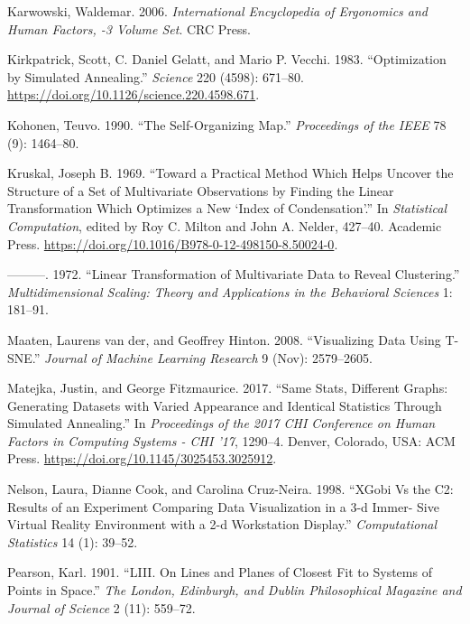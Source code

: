 \documentclass[11,]{article}
\begin{document}
\leavevmode\hypertarget{ref-karwowski_international_2006}{}%
Karwowski, Waldemar. 2006. \emph{International Encyclopedia of Ergonomics and Human Factors, -3 Volume Set}. CRC Press.

\leavevmode\hypertarget{ref-kirkpatrick_optimization_1983}{}%
Kirkpatrick, Scott, C. Daniel Gelatt, and Mario P. Vecchi. 1983. ``Optimization by Simulated Annealing.'' \emph{Science} 220 (4598): 671--80. \url{https://doi.org/10.1126/science.220.4598.671}.

\leavevmode\hypertarget{ref-kohonen_self-organizing_1990}{}%
Kohonen, Teuvo. 1990. ``The Self-Organizing Map.'' \emph{Proceedings of the IEEE} 78 (9): 1464--80.

\leavevmode\hypertarget{ref-kruskal_toward_1969}{}%
Kruskal, Joseph B. 1969. ``Toward a Practical Method Which Helps Uncover the Structure of a Set of Multivariate Observations by Finding the Linear Transformation Which Optimizes a New `Index of Condensation'.'' In \emph{Statistical Computation}, edited by Roy C. Milton and John A. Nelder, 427--40. Academic Press. \url{https://doi.org/10.1016/B978-0-12-498150-8.50024-0}.

\leavevmode\hypertarget{ref-kruskal_linear_1972}{}%
---------. 1972. ``Linear Transformation of Multivariate Data to Reveal Clustering.'' \emph{Multidimensional Scaling: Theory and Applications in the Behavioral Sciences} 1: 181--91.

\leavevmode\hypertarget{ref-maaten_visualizing_2008}{}%
Maaten, Laurens van der, and Geoffrey Hinton. 2008. ``Visualizing Data Using T-SNE.'' \emph{Journal of Machine Learning Research} 9 (Nov): 2579--2605.

\leavevmode\hypertarget{ref-matejka_same_2017}{}%
Matejka, Justin, and George Fitzmaurice. 2017. ``Same Stats, Different Graphs: Generating Datasets with Varied Appearance and Identical Statistics Through Simulated Annealing.'' In \emph{Proceedings of the 2017 CHI Conference on Human Factors in Computing Systems - CHI '17}, 1290--4. Denver, Colorado, USA: ACM Press. \url{https://doi.org/10.1145/3025453.3025912}.

\leavevmode\hypertarget{ref-nelson_xgobi_1998}{}%
Nelson, Laura, Dianne Cook, and Carolina Cruz-Neira. 1998. ``XGobi Vs the C2: Results of an Experiment Comparing Data Visualization in a 3-d Immer- Sive Virtual Reality Environment with a 2-d Workstation Display.'' \emph{Computational Statistics} 14 (1): 39--52.

\leavevmode\hypertarget{ref-pearson_liii._1901}{}%
Pearson, Karl. 1901. ``LIII. On Lines and Planes of Closest Fit to Systems of Points in Space.'' \emph{The London, Edinburgh, and Dublin Philosophical Magazine and Journal of Science} 2 (11): 559--72.
\end{document}
